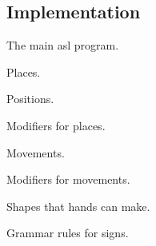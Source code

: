 \begin{appendices}

    \section{Implementation}

    The main asl program.

    \pagebreak

    Places.

    \pagebreak

    Positions.

    \pagebreak

    Modifiers for places.

    \pagebreak

    Movements.

    \pagebreak

    Modifiers for movements.

    \pagebreak

    Shapes that hands can make.

    \pagebreak

    Grammar rules for signs.

    \pagebreak

\end{appendices}
